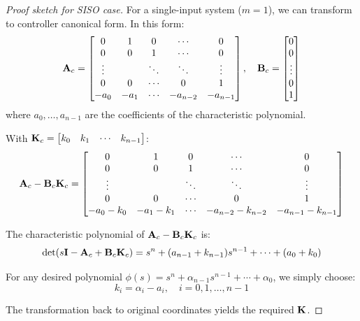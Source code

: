 \begin{proof}[Proof sketch for SISO case]
For a single-input system ($m = 1$), we can transform to controller canonical form. In this form:
\begin{equation}
\mathbf{A}_c = \begin{bmatrix}
0 & 1 & 0 & \cdots & 0 \\
0 & 0 & 1 & \cdots & 0 \\
\vdots & & \ddots & \ddots & \vdots \\
0 & 0 & \cdots & 0 & 1 \\
-a_0 & -a_1 & \cdots & -a_{n-2} & -a_{n-1}
\end{bmatrix}, \quad
\mathbf{B}_c = \begin{bmatrix} 0 \\ 0 \\ \vdots \\ 0 \\ 1 \end{bmatrix}
\end{equation}
where $a_0, \ldots, a_{n-1}$ are the coefficients of the characteristic polynomial.

With $\mathbf{K}_c = \begin{bmatrix} k_0 & k_1 & \cdots & k_{n-1} \end{bmatrix}$:
\begin{equation}
\mathbf{A}_c - \mathbf{B}_c\mathbf{K}_c = \begin{bmatrix}
0 & 1 & 0 & \cdots & 0 \\
0 & 0 & 1 & \cdots & 0 \\
\vdots & & \ddots & \ddots & \vdots \\
0 & 0 & \cdots & 0 & 1 \\
-a_0-k_0 & -a_1-k_1 & \cdots & -a_{n-2}-k_{n-2} & -a_{n-1}-k_{n-1}
\end{bmatrix}
\end{equation}

The characteristic polynomial of $\mathbf{A}_c - \mathbf{B}_c\mathbf{K}_c$ is:
\begin{equation}
\det(s\mathbf{I} - \mathbf{A}_c + \mathbf{B}_c\mathbf{K}_c) = s^n + (a_{n-1}+k_{n-1})s^{n-1} + \cdots + (a_0+k_0)
\end{equation}

For any desired polynomial $\phi(s) = s^n + \alpha_{n-1}s^{n-1} + \cdots + \alpha_0$, we simply choose:
\begin{equation}
k_i = \alpha_i - a_i, \quad i = 0, 1, \ldots, n-1
\end{equation}

The transformation back to original coordinates yields the required $\mathbf{K}$.
\end{proof}

